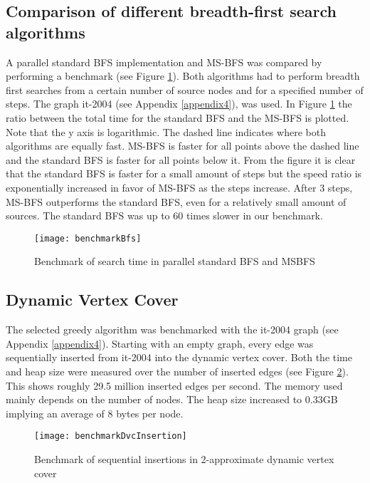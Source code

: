 \subsection{Comparison of different breadth-first search algorithms} \label{bench:msbfs}
A parallel standard BFS implementation and MS-BFS was compared by performing a benchmark (see Figure \ref{fig:benchmarkbfs}). Both algorithms had to perform breadth first searches from a certain number of source nodes and for a specified number of steps. The graph it-2004 (see Appendix \ref{appendix4}), was used. In Figure \ref{fig:benchmarkbfs} the ratio between the total time for the standard BFS and the MS-BFS is plotted. Note that the y axis is logarithmic. The dashed line indicates where both algorithms are equally fast. MS-BFS is faster for all points above the dashed line and the standard BFS is faster for all points below it. From the figure it is clear that the standard BFS is faster for a small amount of steps but the speed ratio is exponentially increased in favor of MS-BFS as the steps increase. After $3$ steps, MS-BFS outperforms the standard BFS, even for a relatively small amount of sources. The standard BFS was up to $60$ times slower in our benchmark.

\begin{figure}[h]
\centering
\texttt{[image: benchmarkBfs]}    
\captionsetup{justification=centering}
\caption {Benchmark of search time in parallel standard BFS and MSBFS}
\label{fig:benchmarkbfs}
\end{figure}
\fi

\subsection{Dynamic Vertex Cover} \label{bench:dvc}
The selected greedy algorithm was benchmarked with the it-2004 graph (see Appendix \ref{appendix4}). Starting with an empty graph, every edge was sequentially inserted from it-2004 into the dynamic vertex cover. Both the time and heap size were measured over the number of inserted edges (see Figure \ref{fig:benchmarkDvcInsertion}). This shows roughly 29.5 million inserted edges per second. The memory used mainly depends on the number of nodes. The heap size increased to 0.33GB implying an average of 8 bytes per node. 

\begin{figure}[h]
\centering
\texttt{[image: benchmarkDvcInsertion]}    
\captionsetup{justification=centering}
\caption {Benchmark of sequential insertions in 2-approximate dynamic vertex cover}
\label{fig:benchmarkDvcInsertion}
\end{figure}

